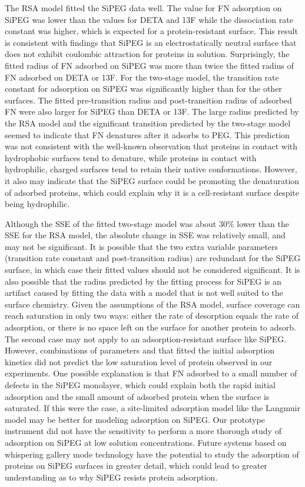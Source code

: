 The RSA model fitted the SiPEG data well. The value for FN adsorption
on SiPEG was lower than the values for DETA and 13F while the dissociation
rate constant was higher, which is expected for a protein-resistant
surface. This result is consistent with findings that SiPEG is an
electrostatically neutral surface that does not exhibit coulombic
attraction for proteins in solution. Surprisingly, the fitted radius
of FN adsorbed on SiPEG was more than twice the fitted radius of FN
adsorbed on DETA or 13F. For the two-stage model, the transition rate
constant for adsorption on SiPEG was significantly higher than for
the other surfaces. The fitted pre-transition radius and post-transition
radius of adsorbed FN were also larger for SiPEG than DETA or 13F.
The large radius predicted by the RSA model and the significant transition
predicted by the two-stage model seemed to indicate that FN denatures
after it adsorbs to PEG. This prediction was not consistent with the
well-known observation that proteins in contact with hydrophobic surfaces
tend to denature, while proteins in contact with hydrophilic, charged
surfaces tend to retain their native conformations. However, it also
may indicate that the SiPEG surface could be promoting the denaturation
of adsorbed proteins, which could explain why it is a cell-resistant
surface despite being hydrophilic. 

Although the SSE of the fitted two-stage model was about 30\% lower
than the SSE for the RSA model, the absolute change in SSE was relatively
small, and may not be significant. It is possible that the two extra
variable parameters (transition rate constant and post-transition
radius) are redundant for the SiPEG surface, in which case their fitted
values should not be considered significant. It is also possible that
the radius predicted by the fitting process for SiPEG is an artifact
caused by fitting the data with a model that is not well suited to
the surface chemistry. Given the assumptions of the RSA model, surface
coverage can reach saturation in only two ways: either the rate of
desorption equals the rate of adsorption, or there is no space left
on the surface for another protein to adsorb. The second case may
not apply to an adsorption-resistant surface like SiPEG. However,
combinations of parameters and that fitted the initial adsorption
kinetics did not predict the low saturation level of protein observed
in our experiments. One possible explanation is that FN adsorbed to
a small number of defects in the SiPEG monolayer, which could explain
both the rapid initial adsorption and the small amount of adsorbed
protein when the surface is saturated. If this were the case, a site-limited
adsorption model like the Langmuir model may be better for modeling
adsorption on SiPEG. Our prototype instrument did not have the sensitivity
to perform a more thorough study of adsorption on SiPEG at low solution
concentrations. Future systems based on whispering gallery mode technology
have the potential to study the adsorption of proteins on SiPEG surfaces
in greater detail, which could lead to greater understanding as to
why SiPEG resists protein adsorption. 


